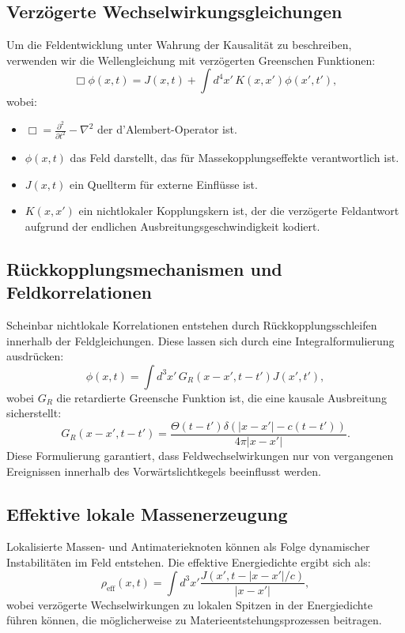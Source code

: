 \documentclass[a4paper,11pt]{article}
\begin{document}
	\subsection{Verzögerte Wechselwirkungsgleichungen}
	Um die Feldentwicklung unter Wahrung der Kausalität zu beschreiben, verwenden wir die Wellengleichung mit verzögerten Greenschen Funktionen:
	\begin{equation}
		\Box \phi(x,t) = J(x,t) + \int d^4x' \, K(x,x') \phi(x',t'),
	\end{equation}
	wobei:
	\begin{itemize}
		\item $\Box = \frac{\partial^2}{\partial t^2} - \nabla^2$ der d'Alembert-Operator ist.
		\item $\phi(x,t)$ das Feld darstellt, das für Massekopplungseffekte verantwortlich ist.
		\item $J(x,t)$ ein Quellterm für externe Einflüsse ist.
		\item $K(x,x')$ ein nichtlokaler Kopplungskern ist, der die verzögerte Feldantwort aufgrund der endlichen Ausbreitungsgeschwindigkeit kodiert.
	\end{itemize}
	
	\subsection{Rückkopplungsmechanismen und Feldkorrelationen}
	Scheinbar nichtlokale Korrelationen entstehen durch Rückkopplungsschleifen innerhalb der Feldgleichungen. Diese lassen sich durch eine Integralformulierung ausdrücken:
	\begin{equation}
		\phi(x,t) = \int d^3x' \, G_R(x-x',t-t') J(x',t'),
	\end{equation}
	wobei $G_R$ die retardierte Greensche Funktion ist, die eine kausale Ausbreitung sicherstellt:
	\begin{equation}
		G_R(x-x',t-t') = \frac{\Theta(t-t') \delta(|x-x'| - c(t-t'))}{4\pi |x-x'|}.
	\end{equation}
	Diese Formulierung garantiert, dass Feldwechselwirkungen nur von vergangenen Ereignissen innerhalb des Vorwärtslichtkegels beeinflusst werden.
	
	\subsection{Effektive lokale Massenerzeugung}
	Lokalisierte Massen- und Antimaterieknoten können als Folge dynamischer Instabilitäten im Feld entstehen. Die effektive Energiedichte ergibt sich als:
	\begin{equation}
		\rho_{\text{eff}}(x,t) = \int d^3x' \frac{J(x',t- |x-x'|/c)}{|x-x'|},
	\end{equation}
	wobei verzögerte Wechselwirkungen zu lokalen Spitzen in der Energiedichte führen können, die möglicherweise zu Materieentstehungsprozessen beitragen.
	
\end{document}
